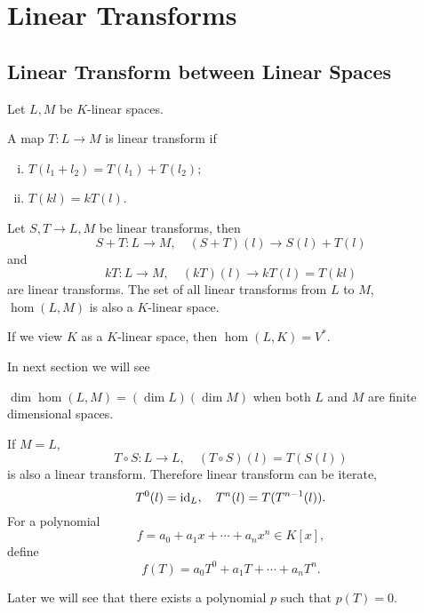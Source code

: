 \section{Linear Transforms}
\subsection{Linear Transform between Linear Spaces}
Let $L, M$ be $K$-linear spaces.
\begin{defi}
A map $T : L \to M$ is linear transform if
\begin{enumerate}[i).]
\item $T(l_1 + l_2) = T(l_1) + T(l_2)$;
\item $T(kl) = kT(l)$.
\end{enumerate}
\end{defi}
Let $S, T \to L, M$ be linear transforms, then
$$S + T : L \to M, \quad (S + T)(l) \to S(l) + T(l)$$
and
$$kT : L \to M, \quad (kT)(l) \to kT(l) = T(kl)$$
are linear transforms.
The set of all linear transforms from $L$ to $M$,
$\hom(L, M)$ is also a $K$-linear space.

If we view $K$ as a $K$-linear space, then $\hom(L, K) = V^\ast$.

In next section we will see
\begin{pro}
$\dim \hom(L, M) = (\dim L)(\dim M)$ when both $L$ and $M$ are finite dimensional spaces.
\end{pro}

If $M = L$,
$$T \circ S : L \to L, \quad (T \circ S)(l) = T(S(l))$$
is also a linear transform. Therefore linear transform can be iterate,
$$T^0(l) = {\mathop{\mathrm{id}}}_L, \quad T^n(l) = T(T^{n-1}(l)).$$
For a polynomial $$f = a_0 + a_1 x + \cdots + a_n x^n \in K[x],$$
define $$f(T) = a_0 T^0 + a_1 T + \cdots + a_n T^n.$$

Later we will see that there exists a polynomial $p$ such that $p(T) = 0$.


